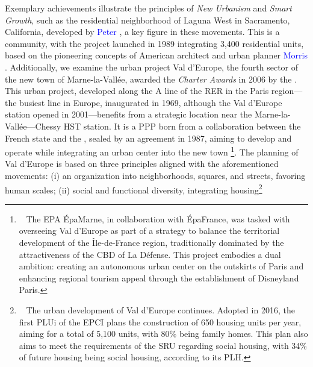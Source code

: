 \begin{refsegment}
Exemplary achievements illustrate the principles of \textsl{New Urbanism} and \textsl{Smart Growth}, such as the residential neighborhood of Laguna West in Sacramento, California, developed by \textcolor{blue}{Peter} \textcolor{blue}{\textcite[146-149]{calthorpe_next_1993}}, a key figure in these movements. This is a  community, with the project launched in 1989 integrating 3,400 residential units, based on the pioneering concepts of American architect and urban planner \textcolor{blue}{Morris} \textcolor{blue}{\textcite[]{newman_focus_1991-1}}. Additionally, we examine the urban project Val d'Europe, the fourth sector of the new town of Marne-la-Vallée, awarded the \textsl{Charter Awards} in 2006 by the \textcolor{blue}{\textcite{congress_for_the_new_urbanism_cnu_2006}}. This urban project, developed along the A line of the \acrfull{RER} in the Paris region—the busiest line in Europe, inaugurated in 1969, although the Val d'Europe station opened in 2001—benefits from a strategic location near the Marne-la-Vallée—Chessy \acrshort{HST} station. It is a \acrfull{PPP} born from a collaboration between the French state and the , sealed by an agreement in 1987, aiming to develop and operate  while integrating an urban center into the new town \textcolor{blue}{\autocite{epamarne_val_nodate}}\footnote{~
    The \acrfull{EPA} ÉpaMarne, in collaboration with ÉpaFrance, was tasked with overseeing Val d'Europe as part of a strategy to balance the territorial development of the Île-de-France region, traditionally dominated by the attractiveness of the \acrfull{CBD} of La Défense. This project embodies a dual ambition: creating an autonomous urban center on the outskirts of Paris and enhancing regional tourism appeal through the establishment of Disneyland Paris.
}. The planning of Val d'Europe is based on three principles aligned with the aforementioned movements: (i) an organization into neighborhoods, squares, and streets, favoring human scales; (ii) social and functional diversity, integrating housing\footnote{~
    The urban development of Val d'Europe continues. Adopted in 2016, the first \acrfull{PLUi} of the \acrshort{EPCI} plans the construction of 650 housing units per year, aiming for a total of 5,100 units, with 80\% being family homes. This plan also aims to meet the requirements of the \acrfull{SRU} regarding social housing, with 34\% of future housing being social housing, according to its \acrfull{PLH}.
}
\end{refsegment}
